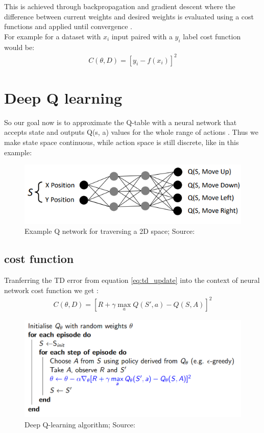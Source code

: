 This is achieved through backpropagation and gradient descent where the difference between current weights and desired weights is evaluated using a cost functions and applied until convergence \cite{lecture_intro_to_deep_rl} .\\

For example for a dataset with $x_i$ input paired with a $y_i$ label cost function would be: 
\begin{align}
    C(\theta, D) = [y_i - f(x_i)]^2
\end{align}

\section{Deep Q learning}

So our goal now is to approximate the Q-table with a neural network that accepts state and outputs Q(s, a) 
values for the whole range of actions \cite{lecture_intro_to_deep_rl}. Thus we make state space continuous, while action space is still discrete, like in this example:

\begin{figure}[h!]
  \centering
  \includegraphics[scale=0.5]{figures/q_network.PNG}
  \caption{Example Q network for traversing a 2D space; Source: \cite{lecture_intro_to_deep_rl}}
  \label{fig:q_network  }
\end{figure}

\subsection{cost function}
Tranferring the TD error from equation \ref{eq:td_update} into the context of neural network cost function we get \cite{lecture_intro_to_deep_rl}:
\begin{align}
    C(\theta, D) = [R + \gamma \max_a Q(S', a) - Q(S, A)]^2
\end{align}
\begin{figure}[h!]
  \centering
  \includegraphics[scale=0.5]{figures/dqn_first.PNG}
  \caption{Deep Q-learning algorithm; Source: \cite{lecture_dqn}}
  \label{fig:dqn_first}
\end{figure}

